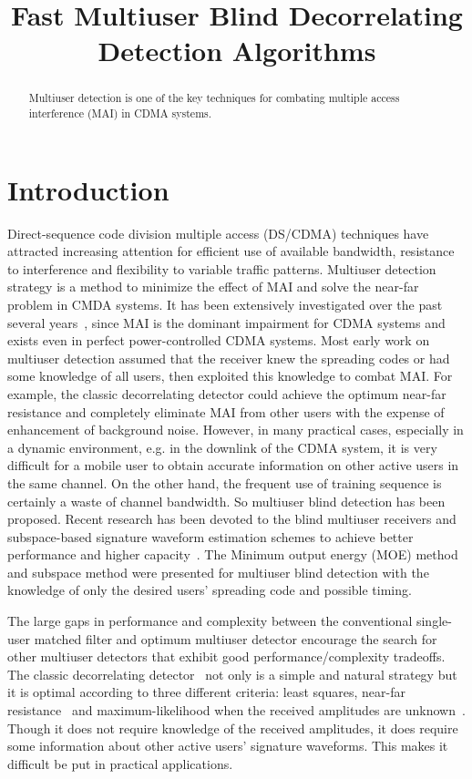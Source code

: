 \documentclass[a4paper,11pt,fleqn]{article}
\title{Fast Multiuser Blind Decorrelating Detection Algorithms}
\date{}
\author{}
\begin{document}
\maketitle

\begin{abstract}
Multiuser detection is one of the key techniques for combating
multiple access interference (MAI) in CDMA systems.
\end{abstract}

\section{Introduction}

Direct-sequence code division multiple access (DS/CDMA) techniques
have attracted increasing attention for efficient use of available
bandwidth, resistance to interference and flexibility to variable
traffic patterns. Multiuser detection strategy is a method to
minimize the effect of MAI and solve the near-far problem in CMDA
systems. It has been extensively investigated over the past
several years~\cite{Verd98}, since MAI is the dominant impairment
for CDMA systems and exists even in perfect power-controlled CDMA
systems. Most early work on multiuser detection assumed that the
receiver knew the spreading codes or had some knowledge of all
users, then exploited this knowledge to combat MAI. For example,
the classic decorrelating detector could achieve the optimum
near-far resistance and completely eliminate MAI from other users
with the expense of enhancement of background noise. However, in
many practical cases, especially in a dynamic environment, e.g. in
the downlink of the CDMA system, it is very difficult for a mobile
user to obtain accurate information on other active users in the
same channel. On the other hand, the frequent use of training
sequence is certainly a waste of channel bandwidth. So multiuser
blind detection has been proposed. Recent research has been
devoted to the blind multiuser receivers and subspace-based
signature waveform estimation schemes to achieve better
performance and higher capacity~\cite{Honi95, Poor97, Wang98,
Torl97, Liu96}. The Minimum output energy (MOE) method and
subspace method were presented for multiuser blind detection with
the knowledge of only the desired users' spreading code and
possible timing.

The large gaps in performance and complexity between the
conventional single-user matched filter and optimum multiuser
detector encourage the search for other multiuser detectors that
exhibit good performance/complexity tradeoffs. The classic
decorrelating detector~\cite{Lupa89} not only is a simple and
natural strategy but it is optimal according to three different
criteria: least squares, near-far resistance~\cite{Verd86} and
maximum-likelihood when the received amplitudes are
unknown~\cite{Lupa89}. Though it does not require knowledge of the
received amplitudes, it does require some information about other
active users' signature waveforms. This makes it difficult be put
in practical applications.
\end{document}
